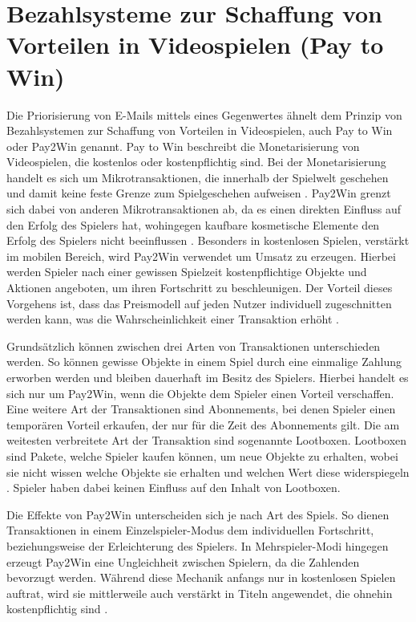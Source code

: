 
\section{Bezahlsysteme zur Schaffung von Vorteilen in Videospielen (Pay to Win)}
\label{Bezahlsysteme_zur_Schaffung_von_Vorteilen_in_Videospielen_(Pay_to_Win)}

Die Priorisierung von E-Mails mittels eines Gegenwertes ähnelt dem Prinzip von Bezahlsystemen zur Schaffung von Vorteilen in Videospielen, auch Pay to Win oder Pay2Win genannt. Pay to Win beschreibt die Monetarisierung von Videospielen, die kostenlos oder kostenpflichtig sind. Bei der Monetarisierung handelt es sich um Mikrotransaktionen, die innerhalb der Spielwelt geschehen und damit keine feste Grenze zum Spielgeschehen aufweisen \citep[S. 18]{Tomic2019}. Pay2Win grenzt sich dabei von anderen Mikrotransaktionen ab, da es einen direkten Einfluss auf den Erfolg des Spielers hat, wohingegen kaufbare kosmetische Elemente den Erfolg des Spielers nicht beeinflussen \citep[S. 124 f.]{Reza2019}. Besonders in kostenlosen Spielen, verstärkt im mobilen Bereich, wird Pay2Win verwendet um Umsatz zu erzeugen. Hierbei werden Spieler nach einer gewissen Spielzeit kostenpflichtige Objekte und Aktionen angeboten, um ihren Fortschritt zu beschleunigen. Der Vorteil dieses Vorgehens ist, dass das Preismodell auf jeden Nutzer individuell zugeschnitten werden kann, was die Wahrscheinlichkeit einer Transaktion erhöht \citep[S. 2]{Alha2014}.

Grundsätzlich können zwischen drei Arten von Transaktionen unterschieden werden. So können gewisse Objekte in einem Spiel durch eine einmalige Zahlung erworben werden und bleiben dauerhaft im Besitz des Spielers. Hierbei handelt es sich nur um Pay2Win, wenn die Objekte dem Spieler einen Vorteil verschaffen. Eine weitere Art der Transaktionen sind Abonnements, bei denen Spieler einen temporären Vorteil erkaufen, der nur für die Zeit des Abonnements gilt. Die am weitesten verbreitete Art der Transaktion sind sogenannte Lootboxen. Lootboxen sind Pakete, welche Spieler kaufen können, um neue Objekte zu erhalten, wobei sie nicht wissen welche Objekte sie erhalten und welchen Wert diese widerspiegeln \citep[S. 20]{Tomic2019}. Spieler haben dabei keinen Einfluss auf den Inhalt von Lootboxen.

Die Effekte von Pay2Win unterscheiden sich je nach Art des Spiels. So dienen Transaktionen in einem Einzelspieler-Modus dem individuellen Fortschritt, beziehungsweise der Erleichterung des Spielers. In Mehrspieler-Modi hingegen erzeugt Pay2Win eine Ungleichheit zwischen Spielern, da die Zahlenden bevorzugt werden. Während diese Mechanik anfangs nur in kostenlosen Spielen auftrat, wird sie mittlerweile auch verstärkt in Titeln angewendet, die ohnehin kostenpflichtig sind \citep[S. 19]{Tomic2019}.

